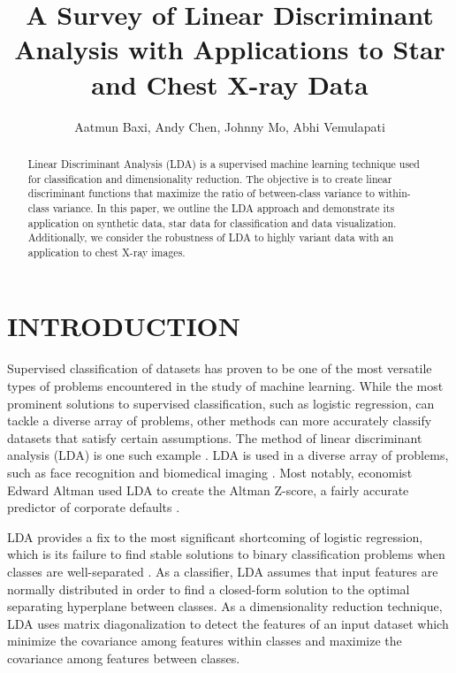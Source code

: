 \documentclass[letterpaper, 10 pt, conference]{ieeeconf}  %
\title{\LARGE \bf
A Survey of Linear Discriminant Analysis with Applications to Star and Chest X-ray Data
}
\author{Aatmun Baxi, Andy Chen, Johnny Mo, Abhi Vemulapati%
}
\begin{document}
\maketitle
\thispagestyle{empty}
\pagestyle{empty}


\begin{abstract}
Linear Discriminant Analysis (LDA) is a supervised machine learning technique used for classification and dimensionality reduction. The objective is to create linear discriminant functions that maximize the ratio of between-class variance to within-class variance. In this paper, we outline the LDA approach and demonstrate its application on synthetic data, star data for classification and data visualization. Additionally, we consider the robustness of LDA to highly variant data with an application to chest X-ray images.
\end{abstract}

\section{INTRODUCTION}

Supervised classification of datasets has proven to be one of the most versatile types of problems encountered in the study of machine learning. While the most prominent solutions to supervised classification, such as logistic regression, can tackle a diverse array of problems, other methods can more accurately classify datasets that satisfy certain assumptions. The method of linear discriminant analysis (LDA) is one such example \autocite{friedman2001elements}. LDA is used in a diverse array of problems, such as face recognition \autocite{Yu2001ADL} and biomedical imaging \autocite{kermanyetal2018}. Most notably, economist Edward Altman used LDA to create the Altman Z-score, a fairly accurate predictor of corporate defaults \autocite{altman}.

LDA provides a fix to the most significant shortcoming of logistic regression, which is its failure to find stable solutions to binary classification problems when classes are well-separated \autocite{bishop2006pattern}. As a classifier, LDA assumes that input features are normally distributed in order to find a closed-form solution to the optimal separating hyperplane between classes. As a dimensionality reduction technique, LDA uses matrix diagonalization to detect the features of an input dataset which minimize the covariance among features within classes and maximize the covariance among features between classes.
\end{document}
